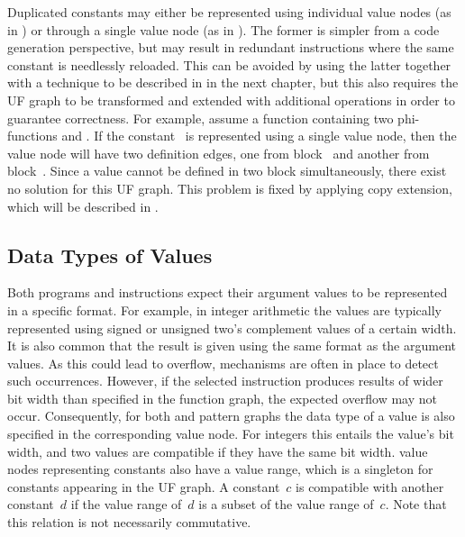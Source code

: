 Duplicated constants may either be represented using individual \glspl{value
  node} (as in ) or through a single
\gls{value node} (as in ).
%
The former is simpler from a \gls{code generation} perspective, but may result
in redundant \glspl{instruction} where the same constant is needlessly reloaded.
%
This can be avoided by using the latter together with a technique to be
described in  in the next chapter, but this
also requires the \gls{UF graph} to be transformed and extended with additional
\glspl{operation} in order to guarantee correctness.
%
For example, assume a \gls{function} containing two \glspl{phi-function}
 and
.
%
If the constant~ is represented using a single \gls{value node}, then
the \gls{value node} will have two \glspl{definition edge}, one from
\gls{block}~ and another from \gls{block}~.
%
Since a value cannot be defined in two \gls{block} simultaneously, there exist
no \gls{solution} for this \gls{UF graph}.
%
This problem is fixed by applying \gls{copy extension}, which will be described
in .


\subsection{Data Types of Values}

Both \glspl{program} and \glspl{instruction} expect their argument values to be
represented in a specific format.
%
For example, in integer arithmetic the values are typically represented using
signed or unsigned two's complement values of a certain width.
%
It is also common that the result is given using the same format as the argument
values.
%
As this could lead to overflow, mechanisms are often in place to detect such
occurrences.
%
However, if the selected \gls{instruction} produces results of wider bit width
than specified in the \gls{function graph}, the expected overflow may not occur.
%
Consequently, for both  and \glspl{pattern graph} the
data type of a value is also specified in the corresponding \gls{value node}.
%
For integers this entails the value's bit width, and two values are compatible
if they have the same bit width.
%
\Glspl{value node} representing constants also have a value range, which is a
singleton for constants appearing in the \gls{UF graph}.
%
A constant~$c$ is compatible with another constant~$d$ if the value range of~$d$
is a subset of the value range of~$c$.
%
Note that this relation is not necessarily commutative.


